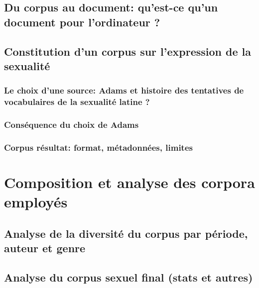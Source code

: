 
\subsection{Du corpus au document: qu’est-ce qu’un document pour l’ordinateur ?}


\subsection{Constitution d’un corpus sur l’expression de la sexualité}

\subsubsection{Le choix d’une source: Adams et histoire des tentatives de vocabulaires de la sexualité latine ?}


\subsubsection{Conséquence du choix de Adams}



\subsubsection{Corpus résultat: format, métadonnées, limites}



\section{Composition et analyse des corpora employés}

\subsection{Analyse de la diversité du corpus par période, auteur et genre}


\subsection{Analyse du corpus sexuel final (stats et autres)}
